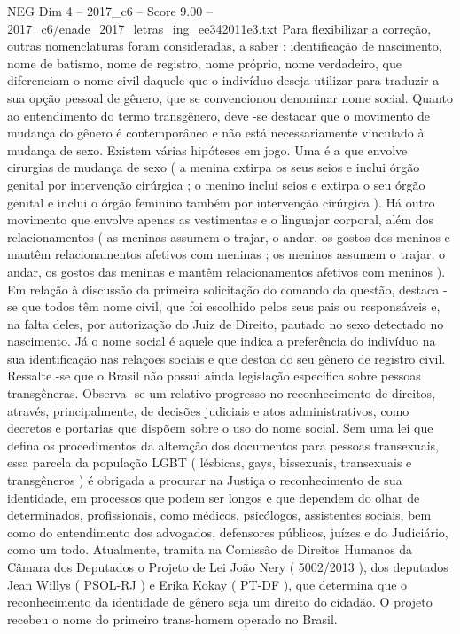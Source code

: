 \begin{textsample}{NEG Dim 4 – 2017\_c6 – Score 9.00 – 2017\_c6/enade\_2017\_letras\_ing\_ee342011e3.txt}
Para flexibilizar a correção, outras nomenclaturas foram consideradas, a saber : identificação de nascimento, nome de batismo, nome de registro, nome próprio, nome verdadeiro, que diferenciam o nome civil daquele que o indivíduo deseja utilizar para traduzir a sua opção pessoal de gênero, que se convencionou denominar nome social.
Quanto ao entendimento do termo transgênero, deve -se destacar que o movimento de mudança do gênero é contemporâneo e não está necessariamente vinculado à mudança de sexo.
Existem várias hipóteses em jogo.
Uma é a que envolve cirurgias de mudança de sexo ( a menina extirpa os seus seios e inclui órgão genital por intervenção cirúrgica ; o menino inclui seios e extirpa o seu órgão genital e inclui o órgão feminino também por intervenção cirúrgica ).
Há outro movimento que envolve apenas as vestimentas e o linguajar corporal, além dos relacionamentos ( as meninas assumem o trajar, o andar, os gostos dos meninos e mantêm relacionamentos afetivos com meninas ; os meninos assumem o trajar, o andar, os gostos das meninas e mantêm relacionamentos afetivos com meninos ).
Em relação à discussão da primeira solicitação do comando da questão, destaca -se que todos têm nome civil, que foi escolhido pelos seus pais ou responsáveis e, na falta deles, por autorização do Juiz de Direito, pautado no sexo detectado no nascimento.
Já o nome social é aquele que indica a preferência do indivíduo na sua identificação nas relações sociais e que destoa do seu gênero de registro civil.
Ressalte -se que o Brasil não possui ainda legislação específica sobre pessoas transgêneras.
Observa -se um relativo progresso no reconhecimento de direitos, através, principalmente, de decisões judiciais e atos administrativos, como decretos e portarias que dispõem sobre o uso do nome social.
Sem uma lei que defina os procedimentos da alteração dos documentos para pessoas transexuais, essa parcela da população LGBT ( lésbicas, gays, bissexuais, transexuais e transgêneros ) é obrigada a procurar na Justiça o reconhecimento de sua identidade, em processos que podem ser longos e que dependem do olhar de determinados, profissionais, como médicos, psicólogos, assistentes sociais, bem como do entendimento dos advogados, defensores públicos, juízes e do Judiciário, como um todo.
Atualmente, tramita na Comissão de Direitos Humanos da Câmara dos Deputados o Projeto de Lei João Nery ( 5002/2013 ), dos deputados Jean Willys ( PSOL-RJ ) e Erika Kokay ( PT-DF ), que determina que o reconhecimento da identidade de gênero seja um direito do cidadão.
O projeto recebeu o nome do primeiro trans-homem operado no Brasil.

\end{textsample}
